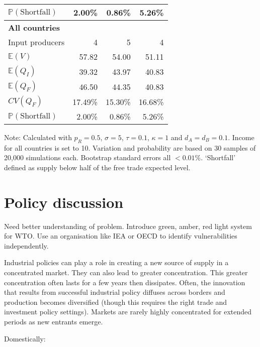 \documentclass{article}
\begin{document}
\begin{table}
\begin{threeparttable}
\begin{tabular}{lrrr}
            $\mathbb{P}(\text{Shortfall})$ & 2.00\% & 0.86\% & 5.26\% \\ 
            \midrule
            \textbf{All countries} \\
            Input producers & 4 & 5 & 4 \\
            $\mathbb{E}(V)$ & 57.82 & 54.00 & 51.11 \\
            $\mathbb{E}(Q_I)$ & 39.32 & 43.97 & 40.83 \\
            $\mathbb{E}(Q_F)$ & 46.50 & 44.35 & 40.83 \\
            $CV(Q_F)$ & 17.49\% & 15.30\% & 16.68\% \\
            $\mathbb{P}(\text{Shortfall})$ & 2.00\% & 0.86\% & 5.26\% \\ 
            \bottomrule
        \end{tabular}
        \begin{tablenotes}
            \small \item Note: Calculated with $p_R = 0.5$, $\sigma = 5$, $\tau = 0.1$, $\kappa = 1$ and $d_A = d_B = 0.1$. Income for all countries is set to 10. Variation and probability are based on 30 samples of 20,000 simulations each. Bootstrap standard errors all $<0.01\%$. `Shortfall' defined as supply below half of the free trade expected level. 
        \end{tablenotes}
    \end{threeparttable}
\end{table}

\section{Policy discussion}

Need better understanding of problem. Introduce green, amber, red light system for WTO. Use an organisation like IEA or OECD to identify vulnerabilities independently.

Industrial policies can play a role in creating a new source of supply in a concentrated market. They can also lead to greater concentration. This greater concentration often lasts for a few years then dissipates. Often, the innovation that results from successful industrial policy diffuses across borders and production becomes diversified (though this requires the right trade and investment policy settings). Markets are rarely highly concentrated for extended periods as new entrants emerge. 

Domestically:
\end{document}
